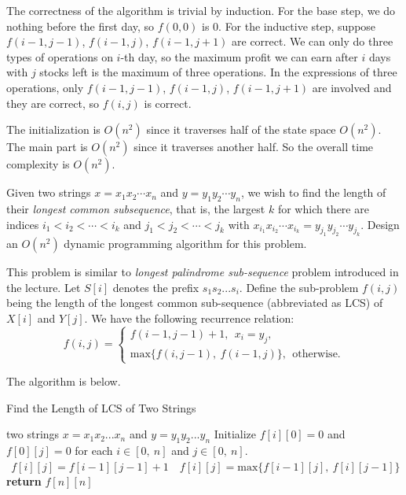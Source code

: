 \documentclass{oxmathproblems}
\begin{document}
\begin{questions}
\begin{Solution}
The correctness of the algorithm is trivial by induction. For the base step, we do nothing before the first day, so $f(0,0)$ is $0$. For the inductive step, suppose $f(i-1, j-1)$, $f(i-1,j)$, $f(i-1,j+1)$ are correct. We can only do three types of operations on $i$-th day, so the maximum profit we can earn after $i$ days with $j$ stocks left is the maximum of three operations. In the expressions of three operations, only $f(i-1, j-1)$, $f(i-1,j)$, $f(i-1,j+1)$ are involved and they are correct, so $f(i,j)$ is correct.

The initialization is $O(n^2)$ since it traverses half of the state space $O(n^2)$. The main part is $O(n^2)$ since it traverses another half. So the overall time complexity is $O(n^2)$.
\end{Solution}

\miquestion[30]
Given two strings $x=x_1x_2\cdots x_n$ and $y=y_1y_2\cdots y_n$, we wish to find the length of their \emph{longest common subsequence}, that is, the largest $k$ for which there are indices $i_1<i_2<\cdots <i_k$ and $j_1<j_2<\cdots<j_k$ with $x_{i_1}x_{i_2}\cdots x_{i_k}=y_{j_1}y_{j_2}\cdots y_{j_k}$. Design an $O(n^2)$ dynamic programming algorithm for this problem.

\begin{Solution}

This problem is similar to \textit{longest palindrome sub-sequence} problem introduced in the lecture. Let $S[i]$ denotes the prefix $s_1s_2...s_i$. Define the sub-problem $f(i, j)$ being the length of the longest common sub-sequence (abbreviated as LCS) of $X[i]$ and $Y[j]$. We have the following recurrence relation:$$
    f(i, j)=\left\{
                \begin{array}{ll}
                  f(i-1, j-1)+1,\ \ x_i=y_j,\\
                  \text{max}\{f(i, j-1),\ f(i-1, j)\},\ \ \text{otherwise.}
                \end{array}
              \right.
$$

The algorithm is below.

\begin{algorithm}[H]
    \caption{Find the Length of LCS of Two Strings}
    \label{}
    \renewcommand{\algorithmicrequire}{\textbf{Input:}}
    \begin{algorithmic}[1]
        \Require two strings $x=x_1x_2...x_n$ and $y=y_1y_2...y_n$
        \State Initialize $f[i][0]=0$ and $f[0][j]=0$ for each $i\in[0,\ n]$ and $j\in[0,\ n]$.
            $\ \ f[i][j]=f[i-1][j-1]+1$
        \Else
             $\ \ \ f[i][j]=\text{max}\{f[i-1][j],\ f[i][j-1]\}$
        \EndIf
        \EndFor
        \EndFor
        \State \textbf{return} $f[n][n]$
    \end{algorithmic}
\end{algorithm}


\end{Solution}
\end{questions}
\end{document}

